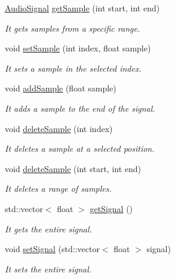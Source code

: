 \begin{DoxyCompactItemize}
\hyperlink{class_audio_signal}{Audio\+Signal} \hyperlink{class_audio_signal_adfa4565e6ff0d8dc6bcbf87dbf6d01d1}{get\+Sample} (int start, int end)
\begin{DoxyCompactList}\small\item\em It gets samples from a specific range. \end{DoxyCompactList}\item 
void \hyperlink{class_audio_signal_aeef099025639235c7f062294470a691f}{set\+Sample} (int index, float sample)
\begin{DoxyCompactList}\small\item\em It sets a sample in the selected index. \end{DoxyCompactList}\item 
void \hyperlink{class_audio_signal_a94c974f752e3045190944860bd8b0ad8}{add\+Sample} (float sample)
\begin{DoxyCompactList}\small\item\em It adds a sample to the end of the signal. \end{DoxyCompactList}\item 
void \hyperlink{class_audio_signal_aac1c34bc8bfcf31fdbac847e67cbea7f}{delete\+Sample} (int index)
\begin{DoxyCompactList}\small\item\em It deletes a sample at a selected position. \end{DoxyCompactList}\item 
void \hyperlink{class_audio_signal_a0c12f9dab81440c887138f8308d5f3b6}{delete\+Sample} (int start, int end)
\begin{DoxyCompactList}\small\item\em It deletes a range of samples. \end{DoxyCompactList}\item 
std\+::vector$<$ float $>$ \hyperlink{class_audio_signal_aa86d766d3fe58e23a852751bbe2ecc78}{get\+Signal} ()
\begin{DoxyCompactList}\small\item\em It gets the entire signal. \end{DoxyCompactList}\item 
void \hyperlink{class_audio_signal_a90eda59db04d3b18bd1949b8fa9e9c81}{set\+Signal} (std\+::vector$<$ float $>$ signal)
\begin{DoxyCompactList}\small\item\em It sets the entire signal. \end{DoxyCompactList}\item 

\end{DoxyCompactItemize}
